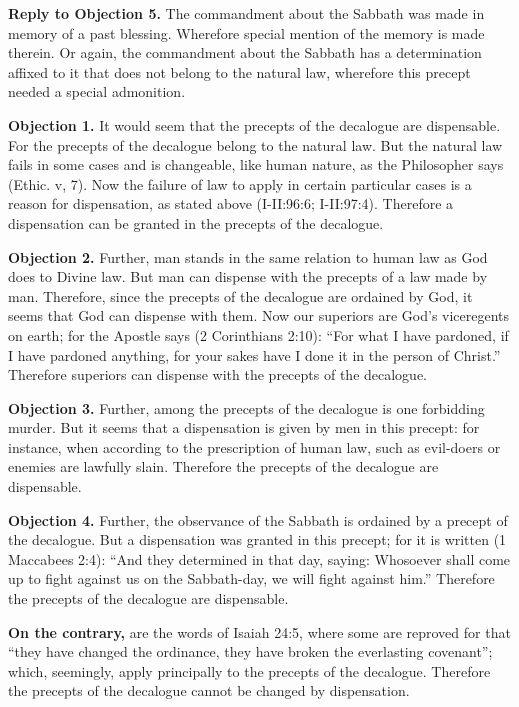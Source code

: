 \textbf{Reply to Objection 5.} The commandment about the Sabbath was made in memory of a past blessing. Wherefore special mention of the memory is made therein. Or again, the commandment about the Sabbath has a determination affixed to it that does not belong to the natural law, wherefore this precept needed a special admonition.


\textbf{Objection 1.} It would seem that the precepts of the decalogue are dispensable. For the precepts of the decalogue belong to the natural law. But the natural law fails in some cases and is changeable, like human nature, as the Philosopher says (Ethic. v, 7). Now the failure of law to apply in certain particular cases is a reason for dispensation, as stated above (I-II:96:6; I-II:97:4). Therefore a dispensation can be granted in the precepts of the decalogue.

\textbf{Objection 2.} Further, man stands in the same relation to human law as God does to Divine law. But man can dispense with the precepts of a law made by man. Therefore, since the precepts of the decalogue are ordained by God, it seems that God can dispense with them. Now our superiors are God's viceregents on earth; for the Apostle says (2 Corinthians 2:10): ``For what I have pardoned, if I have pardoned anything, for your sakes have I done it in the person of Christ.'' Therefore superiors can dispense with the precepts of the decalogue.

\textbf{Objection 3.} Further, among the precepts of the decalogue is one forbidding murder. But it seems that a dispensation is given by men in this precept: for instance, when according to the prescription of human law, such as evil-doers or enemies are lawfully slain. Therefore the precepts of the decalogue are dispensable.

\textbf{Objection 4.} Further, the observance of the Sabbath is ordained by a precept of the decalogue. But a dispensation was granted in this precept; for it is written (1 Maccabees 2:4): ``And they determined in that day, saying: Whosoever shall come up to fight against us on the Sabbath-day, we will fight against him.'' Therefore the precepts of the decalogue are dispensable.

\textbf{On the contrary,} are the words of Isaiah 24:5, where some are reproved for that ``they have changed the ordinance, they have broken the everlasting covenant''; which, seemingly, apply principally to the precepts of the decalogue. Therefore the precepts of the decalogue cannot be changed by dispensation.

